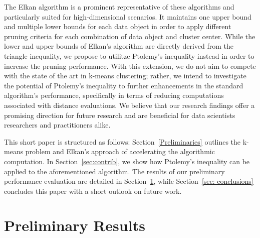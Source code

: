 The Elkan algorithm \cite{DBLP:conf/icml/Elkan03} is a prominent representative of these algorithms and particularly suited for high-dimensional scenarios.
It maintains one upper bound and multiple lower bounds for each data object in order to apply different pruning criteria for each combination of data object and cluster center.
While the lower and upper bounds of Elkan's algorithm are directly derived from the triangle inequality, we propose to utilitze Ptolemy's inequality instead in order to increase the pruning performance.
With this extension, we do not aim to compete with the state of the art in k-means clustering;
rather, we intend to investigate the potential of Ptolemy’s inequality to further enhancements in the standard algorithm’s performance, specifically in terms of reducing computations associated with distance evaluations. We believe that our research findings offer a promising direction for future research and are beneficial for data scientists researchers and practitioners alike.

This short paper is structured as follows:
Section~\ref{Preliminaries} outlines the k-means problem and Elkan's approach of accelerating the algorithmic computation.
In Section~\ref{sec:contrib}, we show how Ptolemy's inequality can be applied to the aforementioned algorithm. %
The results of our preliminary performance evaluation are detailed in Section~\ref{sec: results}, while Section~\ref{sec: conclusions} concludes this paper with a short outlook on future work.













\section{Preliminary Results}\label{sec: results}





